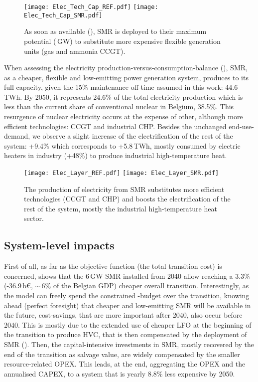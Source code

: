 \begin{figure}[htbp!]
\centering
\texttt{[image: Elec\_Tech\_Cap\_REF.pdf]}
\texttt{[image: Elec\_Tech\_Cap\_SMR.pdf]}
\caption{As soon as available (), \acrfull{SMR} is deployed to their maximum potential (\,GW) to substitute more expensive flexible generation units (\ie gas and ammonia \gls{CCGT}).}
\label{fig:results_deter_tech_cap_elec}
\end{figure}

When assessing the electricity production-versus-consumption-balance (), \gls{SMR}, as a cheaper, flexible and low-emitting power generation system, produces to its full capacity, given the 15\% maintenance off-time assumed in this work: 44.6\,TWh. By 2050, it represents 24.6\% of the total electricity production which is less than the current share of conventional nuclear in Belgium, 38.5\%. This resurgence of nuclear electricity occurs at the expense of other, although more efficient technologies: \gls{CCGT} and industrial \gls{CHP}. Besides the unchanged end-use-demand, we observe a slight increase of the electrification of the rest of the system: +9.4\% which corresponds to +5.8\,TWh, mostly consumed by electric heaters in industry (+48\%) to produce industrial high-temperature heat.

\begin{figure}[htbp!]
\centering
\texttt{[image: Elec\_Layer\_REF.pdf]}
\texttt{[image: Elec\_Layer\_SMR.pdf]}
\caption{The production of electricity from \gls{SMR} substitutes more efficient technologies (\ie \gls{CCGT} and \gls{CHP}) and boosts the electrification of the rest of the system, mostly the industrial high-temperature heat sector.}
\label{fig:results_deter_layer_elec}
\end{figure}


\subsection{System-level impacts}
\label{subsec:atom_mol:results_deter_overall}
First of all, as far as the objective function (\ie the total transition cost) is concerned,  shows that the 6\,GW \gls{SMR} installed from 2040 allow reaching a 3.3\% (-36.9\,b€, $\sim$\,6\% of the Belgian GDP) cheaper overall transition. Interestingly, as the model can freely spend the constrained -budget over the transition, knowing ahead (\ie perfect foresight) that cheaper and low-emitting \gls{SMR} will be available in the future, cost-savings, that are more important after 2040, also occur before 2040. This is mostly due to the extended use of cheaper \gls{LFO} at the beginning of the transition to produce \gls{HVC}, that is then compensated by the deployment of \gls{SMR} (). Then, the capital-intensive investments in \gls{SMR}, mostly recovered by the end of the transition as salvage value, are widely compensated by the smaller resource-related OPEX. This leads, at the end, aggregating the OPEX and the annualised CAPEX, to a system that is yearly 8.8\% less expensive by 2050.

